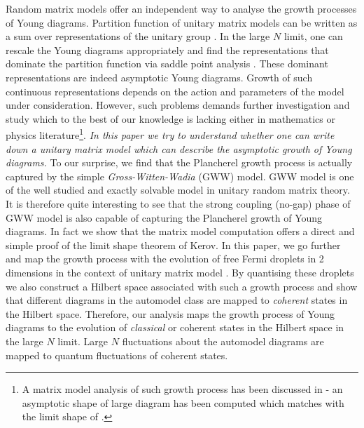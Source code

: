 \documentclass[final,3p,12pt,times]{elsarticle}
\numberwithin{equation}{section}
\begin{document}
Random matrix models offer an independent way to analyse the growth processes of Young diagrams. Partition function of unitary matrix models can be written as a sum over representations of the unitary group \cite{Kazakov:1995ae, duttagopakumar}. In the large $N$ limit, one can rescale the Young diagrams appropriately and find the representations that dominate the partition function via saddle point analysis \cite{duttagopakumar}. These dominant representations are indeed asymptotic Young diagrams. Growth of such continuous representations depends on the action and parameters of the model under consideration. {However, such problems demands further investigation and study which to the best of our knowledge is lacking either in mathematics or physics literature}\footnote{A matrix model analysis of such growth process has been discussed in \cite{Eynard:2008mt} - an asymptotic shape of large diagram has been computed which matches with the limit shape of \cite{2003math.4010I,Kerov1,LogShe,VerKer77}.}. \emph{In this paper we try to understand whether one can write down a unitary matrix model which can describe the asymptotic growth of Young diagrams.} To our surprise, we find that the Plancherel growth process is actually captured by the simple \emph{Gross-Witten-Wadia} (GWW) model. GWW model is one of the well studied and exactly solvable model in unitary random matrix theory. It is therefore quite interesting to see that the strong coupling (no-gap) phase of GWW model is also {capable of capturing} the Plancherel growth of Young diagrams. In fact we show that the matrix model computation offers a direct and simple proof of the limit shape theorem of Kerov. In this paper, we go further and map the growth process with the evolution of free Fermi droplets in 2 dimensions in the context of unitary matrix model \cite{duttagopakumar}. By quantising these droplets we also construct a Hilbert space associated with such a growth process and show that different diagrams in the automodel class are mapped to \emph{coherent} states in the Hilbert space. Therefore, our analysis maps the growth process of Young diagrams to the evolution of \emph{classical} or coherent states in the Hilbert space in the large $N$ limit. Large $N$ fluctuations about the automodel diagrams \cite{2003math.4010I} are mapped to quantum fluctuations of coherent states.
\end{document}
